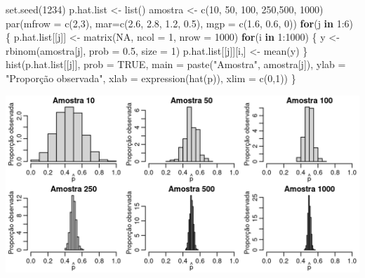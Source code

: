 \documentclass[
  10pt,
  a4paper]{book}
\newenvironment{Shaded}{\begin{snugshade}}{\end{snugshade}}
\newcommand{\AttributeTok}[1]{\textcolor[rgb]{0.77,0.63,0.00}{#1}}
\newcommand{\ConstantTok}[1]{\textcolor[rgb]{0.00,0.00,0.00}{#1}}
\newcommand{\ControlFlowTok}[1]{\textcolor[rgb]{0.13,0.29,0.53}{\textbf{#1}}}
\newcommand{\DecValTok}[1]{\textcolor[rgb]{0.00,0.00,0.81}{#1}}
\newcommand{\FloatTok}[1]{\textcolor[rgb]{0.00,0.00,0.81}{#1}}
\newcommand{\FunctionTok}[1]{\textcolor[rgb]{0.00,0.00,0.00}{#1}}
\newcommand{\NormalTok}[1]{#1}
\newcommand{\OtherTok}[1]{\textcolor[rgb]{0.56,0.35,0.01}{#1}}
\newcommand{\SpecialCharTok}[1]{\textcolor[rgb]{0.00,0.00,0.00}{#1}}
\newcommand{\StringTok}[1]{\textcolor[rgb]{0.31,0.60,0.02}{#1}}
\begin{document}
\begin{Shaded}
\begin{Highlighting}[]
\FunctionTok{set.seed}\NormalTok{(}\DecValTok{1234}\NormalTok{)}
\NormalTok{p.hat.list }\OtherTok{\textless{}{-}} \FunctionTok{list}\NormalTok{()}
\NormalTok{amostra }\OtherTok{\textless{}{-}} \FunctionTok{c}\NormalTok{(}\DecValTok{10}\NormalTok{, }\DecValTok{50}\NormalTok{, }\DecValTok{100}\NormalTok{, }\DecValTok{250}\NormalTok{,}\DecValTok{500}\NormalTok{, }\DecValTok{1000}\NormalTok{)}
\FunctionTok{par}\NormalTok{(}\AttributeTok{mfrow =} \FunctionTok{c}\NormalTok{(}\DecValTok{2}\NormalTok{,}\DecValTok{3}\NormalTok{), }\AttributeTok{mar=}\FunctionTok{c}\NormalTok{(}\FloatTok{2.6}\NormalTok{, }\FloatTok{2.8}\NormalTok{, }\FloatTok{1.2}\NormalTok{, }\FloatTok{0.5}\NormalTok{), }\AttributeTok{mgp =} \FunctionTok{c}\NormalTok{(}\FloatTok{1.6}\NormalTok{, }\FloatTok{0.6}\NormalTok{, }\DecValTok{0}\NormalTok{))}
\ControlFlowTok{for}\NormalTok{(j }\ControlFlowTok{in} \DecValTok{1}\SpecialCharTok{:}\DecValTok{6}\NormalTok{) \{}
\NormalTok{  p.hat.list[[j]] }\OtherTok{\textless{}{-}} \FunctionTok{matrix}\NormalTok{(}\ConstantTok{NA}\NormalTok{, }\AttributeTok{ncol =} \DecValTok{1}\NormalTok{, }\AttributeTok{nrow =} \DecValTok{1000}\NormalTok{)}
  \ControlFlowTok{for}\NormalTok{(i }\ControlFlowTok{in} \DecValTok{1}\SpecialCharTok{:}\DecValTok{1000}\NormalTok{) \{}
\NormalTok{  y }\OtherTok{\textless{}{-}} \FunctionTok{rbinom}\NormalTok{(amostra[j], }\AttributeTok{prob =} \FloatTok{0.5}\NormalTok{, }\AttributeTok{size =} \DecValTok{1}\NormalTok{)}
\NormalTok{  p.hat.list[[j]][i,] }\OtherTok{\textless{}{-}} \FunctionTok{mean}\NormalTok{(y)}
\NormalTok{  \}}
\FunctionTok{hist}\NormalTok{(p.hat.list[[j]], }\AttributeTok{prob =} \ConstantTok{TRUE}\NormalTok{, }\AttributeTok{main =} \FunctionTok{paste}\NormalTok{(}\StringTok{"Amostra"}\NormalTok{, amostra[j]), }
     \AttributeTok{ylab =} \StringTok{"Proporção observada"}\NormalTok{,}
     \AttributeTok{xlab =} \FunctionTok{expression}\NormalTok{(}\FunctionTok{hat}\NormalTok{(p)), }\AttributeTok{xlim =} \FunctionTok{c}\NormalTok{(}\DecValTok{0}\NormalTok{,}\DecValTok{1}\NormalTok{))}
\NormalTok{\}}
\end{Highlighting}
\end{Shaded}

\begin{center}\includegraphics[width=0.99\linewidth]{figures/unnamed-chunk-383-1} \end{center}
\end{document}
